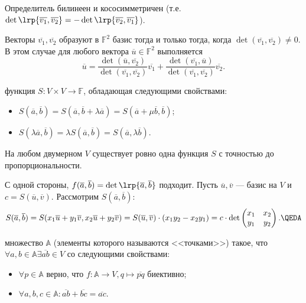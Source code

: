 \documentclass[12pt,a4paper]{article}
\begin{document}
\lemma Определитель билинеен и кососимметричен (т.е. $\det\lrp{\overline{v_1},\overline{v_2}}=-\det\lrp{\overline{v_2},\overline{v_1}}$).

 Векторы $\overline{v_1},\overline{v_2}$ образуют в $\mathbb F^2$ базис тогда и только тогда, когда $\det(\overline{v_1},\overline{v_2})\neq 0$. В этом случае для любого вектора $\overline{u}\in\mathbb F^2$ выполняется \[
	\overline{u}=\frac{\det(\overline{u},\overline{v_2})}{\det(\overline{v_1},\overline{v_2})}\overline{v_1}+\frac{\det(\overline{v_1},\overline{u})}{\det(\overline{v_1},\overline{v_2})}\overline{v_2}.
\]

 функция $S:V\times V\to \mathbb F$, обладающая следующими свойствами:

\begin{itemize}
	\item $S(\overline{a},\overline{b})=S(\overline{a},\overline{b}+\lambda \overline{a})=S(\overline{a}+\mu \overline{b},\overline{b})$;
	\item $S(\lambda \overline{a},\overline{b})=\lambda S(\overline{a},\overline{b})=S(\overline{a},\lambda \overline{b})$.
\end{itemize}

\theorem На любом двумерном $V$ существует ровно одна функция $S$ с точностью до пропорциональности.

\proof С одной стороны, $f(\overline{a},\overline{b})=\det\lrp{\overline{a},\overline{b}}$ подходит. Пусть $\overline{u},\overline{v}$ --- базис на $V$ и $c=S(\overline{u},\overline{v})$. Рассмотрим $S(\overline{a},\overline{b})$: \[
	S(\overline{a},\overline{b})=S(x_1\overline{u}+y_1\overline{v},x_2\overline{u}+y_2\overline{v})=S(\overline{u},\overline{v})\cdot (x_1y_2-x_2y_1)=c\cdot \det\begin{pmatrix}
		x_1 & x_2\\
		y_1 & y_2
\end{pmatrix}.\QEDA
\]

 множество $\mathbb A$ (элементы которого называются <<точками>>) такое, что $\forall a,b\in\mathbb A\exists\overline{ab}\in V$ со следующими свойствами:

\begin{itemize}
	\item $\forall p\in\mathbb A$ верно, что $f:\mathbb A\to V,q\mapsto \overline{pq}$ биективно;
	\item $\forall a,b,c\in\mathbb A:\overline{ab}+\overline{bc}=\overline{ac}$.
\end{itemize}
\end{document}
